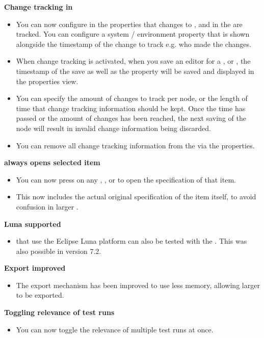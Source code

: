 \textbf{Change tracking in \gdprojects{}}
\begin{itemize}
\item You can now configure in the \gdproject{} properties that changes to \gdcases{}, \gdsuites{} and \gdjobs{} in the \gdproject{} are tracked. You can configure a system / environment property that is shown alongside the timestamp of the change to track e.g. who made the changes. 
\item When change tracking is activated, when you save an editor for a \gdcase{}, \gdsuite{} or \gdjob{}, the timestamp of the save as well as the property will be saved and displayed in the properties view.
\item You can specify the amount of changes to track per node, or the length of time that change tracking information should be kept. Once the time has passed or the amount of changes has been reached, the next saving of the node will result in invalid change information being discarded.
\item You can remove all change tracking information from the \gdproject{} via the \gdproject{} properties. 
\end{itemize}

\textbf{ always opens selected item}
\begin{itemize}
\item You can now press  on any \gdcase{}, \gdsuite{}, or \gdjob{} to open the specification of that item.
\item This now includes the actual original specification of the item itself, to avoid confusion in larger \gdprojects{}. 
\end{itemize}

\textbf{Luna \gdauts{} supported}
\begin{itemize}
\item \gdauts{} that use the Eclipse Luna platform can also be tested with the \ite{}. This was also possible in version 7.2.
\end{itemize}

\textbf{Export improved}
\begin{itemize}
\item The export mechanism has been improved to use less memory, allowing larger \gdprojects{} to be exported.
\end{itemize}

\textbf{Toggling relevance of test runs}
\begin{itemize}
\item You can now toggle the relevance of multiple test runs at once.
\end{itemize}

